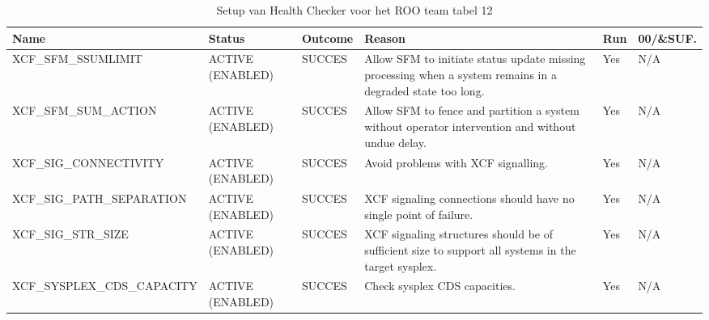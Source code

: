 \begin{landscape}
	\begin{table}[h]
		\begin{tabular}{|l|p{2.3cm}|l|p{4.5cm}|l|l|}
			\hline
			\textbf{Name}                       & \textbf{Status}   & \textbf{Outcome} & \textbf{Reason}    & \textbf{Run} &	\textbf{00/\&SUF.} \\ \hline
			XCF\_SFM\_SSUMLIMIT         & ACTIVE (ENABLED) & SUCCES & Allow SFM to initiate status update missing processing when a   system remains in   a degraded state too long. & Yes & N/A \\ \hline
			XCF\_SFM\_SUM\_ACTION       & ACTIVE (ENABLED) & SUCCES & Allow SFM to fence and partition a system without operator   intervention and    without undue delay.          & Yes & N/A \\ \hline
			XCF\_SIG\_CONNECTIVITY      & ACTIVE (ENABLED) & SUCCES & Avoid   problems with XCF signalling.                                                                          & Yes & N/A \\ \hline
			XCF\_SIG\_PATH\_SEPARATION  & ACTIVE (ENABLED) & SUCCES & XCF   signaling connections should have no single point of failure.                                            & Yes & N/A \\ \hline
			XCF\_SIG\_STR\_SIZE         & ACTIVE (ENABLED) & SUCCES & XCF   signaling structures should be of sufficient size to support all systems in    the target sysplex.       & Yes & N/A \\ \hline
			XCF\_SYSPLEX\_CDS\_CAPACITY & ACTIVE (ENABLED) & SUCCES & Check   sysplex CDS capacities.                                                                                & Yes & N/A \\ \hline
		\end{tabular}
		\caption[Health Checker ROO team tabel 12]{Setup van Health Checker voor het ROO team tabel 12}
		\label{tbl:ROO Team Tabel 12}
	\end{table}
\end{landscape}

